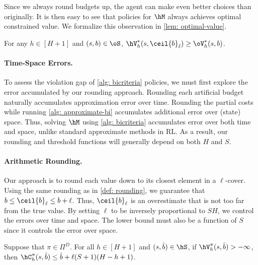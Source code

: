 \documentclass[pdftex, a4paper, 12pt]{article}
\newcommand{\round}[2]{\ceil{#2}_{#1}}
\newcommand{\hb}{\hat{b}}
\begin{document}
Since we always round budgets up, the agent can make even better choices than originally. It is then easy to see that policies for $\hM$ always achieves optimal constrained value. We formalize this observation in \cref{lem: optimal-value}.

\begin{lemma}\label{lem: optimal-value}
    For any $h \in [H+1]$ and $(s,b) \in \oS$, $\hV_h^*(s, \round{\ell}{b}) \geq \oV_h^*(s,b)$.
\end{lemma}


\paragraph{Time-Space Errors.} To assess the violation gap of \cref{alg: bicriteria} policies, we must first explore the error accumulated by our rounding approach. Rounding each artificial budget naturally accumulates approximation error over time. Rounding the partial costs while running \cref{alg: approximate-bi} accumulates additional error over (state) space. Thus, solving $\hM$ using \cref{alg: bicriteria} accumulates error over both time and space, unlike standard approximate methods in RL. As a result, our rounding and threshold functions will generally depend on both $H$ and $S$. 

\paragraph{Arithmetic Rounding.} Our approach is to round each value down to its closest element in a $\ell$-cover. Using the same rounding as in \cref{def: rounding}, we guarantee that $b \leq \round{\ell}{b} \leq b + \ell$. Thus, $\round{\ell}{b}$ is an overestimate that is not too far from the true value. By setting $\ell$ to be inversely proportional to $SH$, we control the errors over time and space. The lower bound must also be a function of $S$ since it controls the error over space.


\begin{lemma}\label{lem: approximate-cost}
    Suppose that $\pi \in \Pi^D$. For all $h \in [H+1]$ and $(s,\hb) \in \hS$, if $\hV^{\pi}_h(s,\hb) > -\infty$, then $\hC^{\pi}_{h}(s,\hb) \leq \hb + \ell(S+1)(H-h+1)$. 
\end{lemma}
\end{document}
